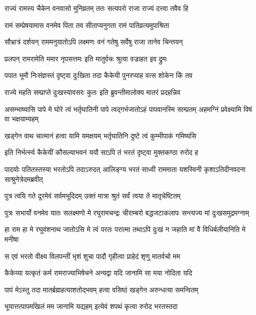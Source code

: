 \twolineshloka
{राज्यं रामस्य चैकेन वनवासो मुनिव्रतम्}
{ततः सत्यपरो राजा राज्यं दत्त्वा तवैव हि} %

\twolineshloka
{रामं सम्प्रेषयामास वनमेव पिता तव}
{सीताप्यनुगता रामं पातिव्रत्यमुपाश्रिता} %

\twolineshloka
{सौभ्रात्रं दर्शयन् राममनुयातोऽपि लक्ष्मणः}
{वनं गतेषु सर्वेषु राजा तानेव चिन्तयन्} %

\twolineshloka
{प्रलपन् रामरामेति ममार नृपसत्तमः}
{इति मातुर्वचः श्रुत्वा वज्राहत इव द्रुमः} %

\twolineshloka
{पपात भूमौ निःसंज्ञस्तं दृष्ट्वा दुःखिता तदा}
{कैकेयी पुनरप्याह वत्स शोकेन किं तव} %

\twolineshloka
{राज्ये महति सम्प्राप्ते दुःखस्यावसरः कुतः}
{इति ब्रुवन्तीमालोक्य मातरं प्रदहन्निव} %

\threelineshloka
{असम्भाष्यासि पापे मे घोरे त्वं भर्तृघातिनी}
{पापे त्वद्गर्भजातोऽहं पापवानस्मि साम्प्रतम्}
{अहमग्निं प्रवेक्ष्यामि विषं वा भक्षयाम्यहम्} %

\twolineshloka
{खड्गेन वाथ चात्मानं हत्वा यामि यमक्षयम्}
{भर्तृघातिनि दुष्टे त्वं कुम्भीपाकं गमिष्यसि} %

\twolineshloka
{इति निर्भर्त्स्य कैकेयीं कौसल्याभवनं ययौ}
{साऽपि तं भरतं दृष्ट्वा मुक्तकण्ठा रुरोद ह} %

\threelineshloka
{पादयोः पतितस्तस्या भरतोऽपि तदाऽरुदत्}
{आलिङ्ग्य भरतं साध्वी राममाता यशस्विनी}
{कृशाऽतिदीनवदना साश्रुनेत्रेदमब्रवीत्} %

\twolineshloka
{पुत्र त्वयि गते दूरमेवं सर्वमभूदिदम्}
{उक्तं मात्रा श्रुतं सर्वं त्वया ते मातृचेष्टितम्} %

\fourlineindentedshloka
{पुत्रः सभार्यो वनमेव यातः}
{सलक्ष्मणो मे रघुरामचन्द्रः}
{चीराम्बरो बद्धजटाकलापः}
{सन्त्यज्य मां दुःखसमुद्रमग्नाम्} %

\fourlineindentedshloka
{हा राम हा मे रघुवंशनाथ}
{जातोऽसि मे त्वं परतः परात्मा}
{तथाऽपि दुःखं न जहाति मां वै}
{विधिर्बलीयानिति मे मनीषा} %

\twolineshloka
{स एवं भरतो वीक्ष्य विलपन्तीं भृशं शुचा}
{पादौ गृहीत्वा प्राहेदं शृणु मातर्वचो मम} %

\twolineshloka
{कैकेय्या यत्कृतं कर्म रामराज्याभिषेचने}
{अन्यद्वा यदि जानामि सा मया नोदिता यदि} %

\twolineshloka
{पापं मेऽस्तु तदा मातर्ब्रह्महत्याशतोद्भवम्}
{हत्वा वसिष्ठं खड्गेन अरुन्धत्या समन्वितम्} %

\twolineshloka
{भूयात्तत्पापमखिलं मम जानामि यद्यहम्}
{इत्येवं शपथं कृत्वा रुरोद भरतस्तदा} %

